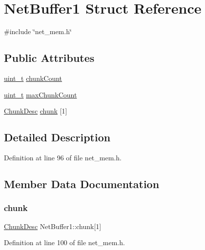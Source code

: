\hypertarget{structNetBuffer1}{}\section{Net\+Buffer1 Struct Reference}
\label{structNetBuffer1}


{\ttfamily \#include \char`\"{}net\+\_\+mem.\+h\char`\"{}}

\subsection*{Public Attributes}
\begin{DoxyCompactItemize}
\item 
\hyperlink{compiler__port_8h_a12a1e9b3ce141648783a82445d02b58d}{uint\+\_\+t} \hyperlink{structNetBuffer1_a05cff68539009da3dd878a7b7d38e1e6}{chunk\+Count}
\item 
\hyperlink{compiler__port_8h_a12a1e9b3ce141648783a82445d02b58d}{uint\+\_\+t} \hyperlink{structNetBuffer1_a17baf9f6d2d0ea0520a6ee1b00e954de}{max\+Chunk\+Count}
\item 
\hyperlink{structChunkDesc}{Chunk\+Desc} \hyperlink{structNetBuffer1_a2450ee8ad02374a831693b3529283739}{chunk} \mbox{[}1\mbox{]}
\end{DoxyCompactItemize}


\subsection{Detailed Description}


Definition at line 96 of file net\+\_\+mem.\+h.



\subsection{Member Data Documentation}
\mbox{\label{structNetBuffer1_a2450ee8ad02374a831693b3529283739}} 
\subsubsection{\texorpdfstring{chunk}{chunk}}
{\footnotesize\ttfamily \hyperlink{structChunkDesc}{Chunk\+Desc} Net\+Buffer1\+::chunk\mbox{[}1\mbox{]}}



Definition at line 100 of file net\+\_\+mem.\+h.

